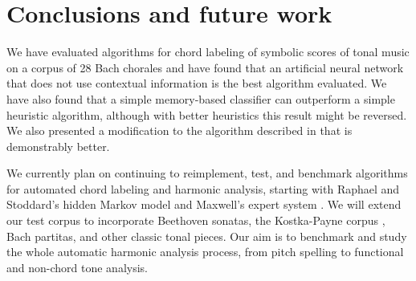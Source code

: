 \section{Conclusions and future work}
\label{sec:conclusions}

We have evaluated algorithms for chord labeling of symbolic scores of
tonal music on a corpus of 28 Bach chorales and have found that an
artificial neural network that does not use contextual information is
the best algorithm evaluated. We have also found that a simple
memory-based classifier can outperform a simple heuristic algorithm,
although with better heuristics this result might be reversed. We also
presented a modification to the algorithm described in
\cite{pardo.ea02:algorithms} that is demonstrably better.

We currently plan on continuing to reimplement, test, and benchmark
algorithms for automated chord labeling and harmonic analysis,
starting with Raphael and Stoddard's hidden Markov model
\cite{raphael.ea03:harmonic} and Maxwell's expert system
\cite{maxwell92:expert}.  We will extend our test corpus to
incorporate Beethoven sonatas, the Kostka-Payne corpus
\cite{temperley04:bayesian}, Bach partitas, and other classic tonal
pieces. Our aim is to benchmark and study the whole automatic harmonic
analysis process, from pitch spelling to functional and non-chord tone
analysis.

